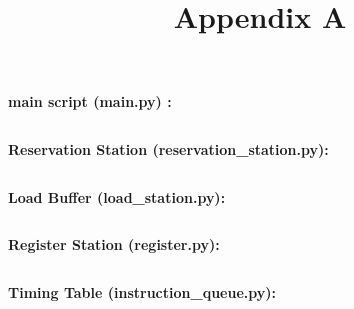 \documentclass[11pt,twoside,a4paper]{article}
\title{Appendix A}
\begin{document}
\maketitle




\newpage
\textbf{main script (main.py) : }
\inputminted[fontsize=\footnotesize,breaklines=true]{python}{main.py}

\newpage
\textbf{Reservation Station (reservation\_station.py): }
\inputminted[fontsize=\footnotesize,breaklines=true]{python}{reservation_station.py}

\newpage
\textbf{Load Buffer (load\_station.py): }
\inputminted[fontsize=\footnotesize,breaklines=true]{python}{load_station.py}

\newpage
\textbf{Register Station (register.py): }
\inputminted[fontsize=\footnotesize,breaklines=true]{python}{register.py}

\newpage
\textbf{Timing Table (instruction\_queue.py): }
\inputminted[fontsize=\footnotesize,breaklines=true]{python}{instruction_queue.py}
\end{document}
